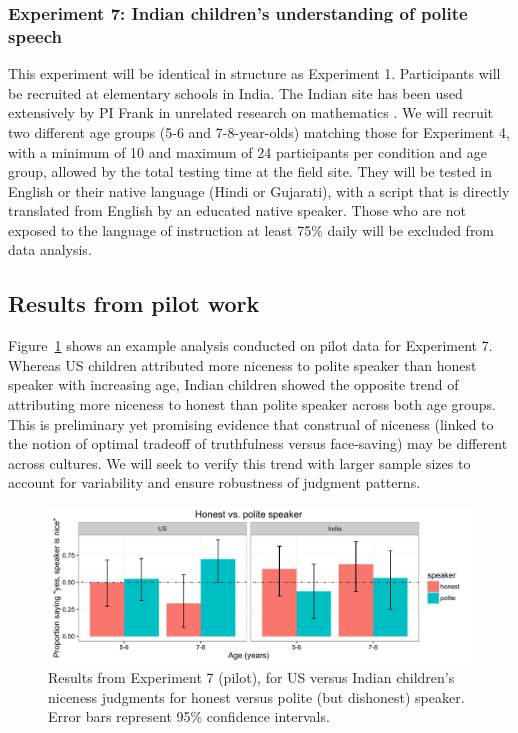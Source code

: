 \subsubsection{Experiment 7: Indian children's understanding of polite speech} 
This experiment will be identical in structure as Experiment 1. Participants will be recruited at elementary schools in India. The Indian site has been used extensively by PI Frank in unrelated research on mathematics \citep{frankbarner2012, barner2016}. We will recruit two different age groups (5-6 and 7-8-year-olds) matching those for Experiment 4, with a minimum of 10 and maximum of 24 participants per condition and age group, allowed by the total testing time at the field site. They will be tested in English or their native language (Hindi or Gujarati), with a script that is directly translated from English by an educated native speaker. Those who are not exposed to the language of instruction at least 75\% daily will be excluded from data analysis. 

\subsection{Results from pilot work} 

Figure~\ref{fig:expt5} shows an example analysis conducted on pilot data for Experiment 7. Whereas US children attributed more niceness to polite speaker than honest speaker with increasing age, Indian children showed the opposite trend of attributing more niceness to honest than polite speaker across both age groups. This is preliminary yet promising evidence that construal of niceness (linked to the notion of optimal tradeoff of truthfulness versus face-saving) may be different across cultures. We will seek to verify this trend with larger sample sizes to account for variability and ensure robustness of judgment patterns.

\begin{figure}[t]
\begin{centering}
\includegraphics[width=\textwidth]{figures/exp4.pdf}
\caption{\label{fig:expt5} Results from Experiment 7 (pilot), for US versus Indian children's niceness judgments for honest versus polite (but dishonest) speaker. Error bars represent 95\% confidence intervals.}
\end{centering}
\end{figure}

